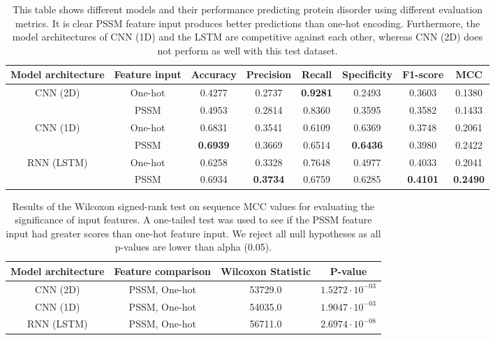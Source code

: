 \documentclass{l4proj}
\begin{document}
\begin{table}[]
    \centering
    \caption{This table shows different models and their performance predicting protein disorder using different evaluation metrics. It is clear PSSM feature input produces better predictions than one-hot encoding. Furthermore, the model architectures of CNN (1D) and the LSTM are competitive against each other, whereas CNN (2D) does not perform as well with this test dataset.}
    \begin{tabular}{@{}cccccccc@{}}
    \toprule
    Model architecture & Feature input & Accuracy & Precision & Recall & Specificity & F1-score & MCC \\ \midrule
    \multirow{2}{*}{CNN (2D)} & One-hot & 0.4277 & 0.2737 & \textbf{0.9281} & 0.2493 & 0.3603 & 0.1380 \\
     & PSSM & 0.4953 & 0.2814 & 0.8360 & 0.3595 & 0.3582 & 0.1433 \\
    \multirow{2}{*}{CNN (1D)} & One-hot & 0.6831 & 0.3541 & 0.6109 & 0.6369 & 0.3748 & 0.2061 \\
     & PSSM & \textbf{0.6939} & 0.3669 & 0.6514 & \textbf{0.6436} & 0.3980 & 0.2422 \\
    \multirow{2}{*}{RNN (LSTM)} & One-hot & 0.6258 & 0.3328 & 0.7648 & 0.4977 & 0.4033 & 0.2041 \\
     & PSSM & 0.6934 & \textbf{0.3734} & 0.6759 & 0.6285 & \textbf{0.4101} & \textbf{0.2490} \\ \cmidrule(l){1-8} 
    \end{tabular}
    
    \label{tab:testDataset}
\end{table}

\begin{table}[!ht]
    \centering
    \caption{Results of the Wilcoxon signed-rank test on sequence MCC values for evaluating the significance of input features. A one-tailed test was used to see if the PSSM feature input had greater scores than one-hot feature input. We reject all null hypotheses as all p-values are lower than alpha (0.05).}
    \begin{tabular}{@{}cccc@{}}
    \toprule
    Model architecture & Feature comparison & Wilcoxon Statistic & P-value \\ \midrule
    CNN (2D) & PSSM, One-hot & 53729.0 & $1.5272\cdot{10^{-03}}$ \\
    CNN (1D) & PSSM, One-hot & 54035.0 & $1.9047\cdot{10^{-03}}$ \\
    RNN (LSTM) & PSSM, One-hot & 56711.0 & $2.6974\cdot{10^{-08}}$ \\ \bottomrule
    \end{tabular}
    
    \label{tab:testwilcinput}
\end{table}
\end{document}
